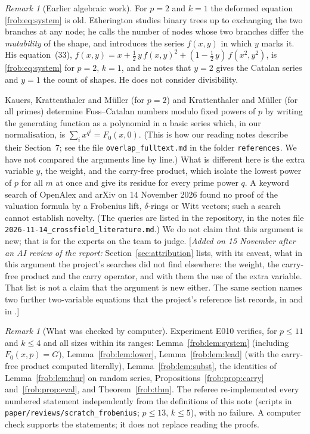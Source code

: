 \documentclass[11pt]{article}
\theoremstyle{definition}
\theoremstyle{remark}
\newtheorem{remark}[theorem]{Remark}
\numberwithin{equation}{section}
\numberwithin{figure}{section}
\newcommand{\revnote}[1]{[\emph{Added on 15 November after an AI review of the report:} #1]}
\begin{document}
\begin{remark}[Earlier algebraic work]
For $p=2$ and $k=1$ the deformed equation \eqref{frob:eq:system} is old. Etherington \cite{Etherington}
studies binary trees up to exchanging the two branches at any node; he calls the number of
nodes whose two branches differ the \emph{mutability} of the shape, and introduces the series
$f(x,y)$ in which $y$ marks it. His equation~(33),
$f(x,y)=x+\tfrac12\,y\,f(x,y)^2+(1-\tfrac12\,y)\,f(x^2,y^2)$, is \eqref{frob:eq:system} for $p=2$,
$k=1$, and he notes that $y=2$ gives the Catalan series and $y=1$ the count of shapes. He
does not consider divisibility.

Kauers, Krattenthaler and M\"uller \cite{KKM} (for $p=2$) and Krattenthaler and M\"uller
\cite{KM} (for all primes) determine Fuss--Catalan numbers modulo fixed powers of
$p$ by writing the generating function as a polynomial in a basic series which, in our
normalisation, is $\sum_ix^{q^i}=F_0(x,0)$. (This is how our reading notes describe their
Section~7; see the file \texttt{overlap\_fulltext.md} in the folder \texttt{references}. We
have not compared the arguments line by line.) What is different here is the extra variable $y$, the weight, and
the carry-free product, which isolate the lowest power of $p$ for all $m$ at once and give
its residue for every prime power $q$. A keyword search of OpenAlex and arXiv on 14 November
2026 found no proof of the valuation formula by a Frobenius lift, $\delta$-rings or Witt
vectors; such a search cannot establish novelty. (The queries are listed in the repository,
in the notes file \nolinkurl{2026-11-14_crossfield_literature.md}.) We do not claim that this argument is new; that is for the
experts on the team to judge.
\revnote{Section~\ref{sec:attribution} lists, with its caveat, what in this argument the project's searches
did not find elsewhere: the weight, the carry-free product and the carry operator, and with them the use of the
extra variable. That list is not a claim that the argument is new either. The same section names two further
two-variable equations that the project's reference list records, in \cite{BonaFlajolet} and in \cite{Polya}.}
\end{remark}

\begin{remark}[What was checked by computer]
Experiment E010 verifies, for $p\le11$ and $k\le4$ and all sizes within its ranges:
Lemma~\ref{frob:lem:system} (including $F_0(x,p)=G$), Lemma~\ref{frob:lem:lower},
Lemma~\ref{frob:lem:lead} (with the carry-free product computed literally),
Lemma~\ref{frob:lem:subst}, the identities of Lemma~\ref{frob:lem:hur} on random series,
Propositions~\ref{frob:prop:carry} and~\ref{frob:prop:eval}, and Theorem~\ref{frob:thm}. The referee
re-implemented every numbered statement independently from the definitions of this note
(scripts in \texttt{paper/reviews/scratch\_frobenius}; $p\le13$, $k\le5$), with no failure.
A computer check supports the statements; it does not replace reading the proofs.
\end{remark}
\end{document}
